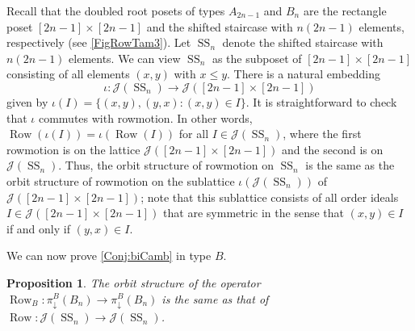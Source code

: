 \documentclass[11pt]{amsart}
\newtheorem{proposition}[theorem]{Proposition}
\theoremstyle{definition}
\DeclareMathOperator{\row}{Row}
\DeclareMathOperator{\SSS}{SS}
\begin{document}
Recall that the doubled root posets of types $A_{2n-1}$ and $B_n$ are the rectangle poset $[2n-1]\times[2n-1]$ and the shifted staircase with $n(2n-1)$ elements, respectively (see \cref{FigRowTam3}). Let $\SSS_n$ denote the shifted staircase with $n(2n-1)$ elements. We can view $\SSS_n$ as the subposet of $[2n-1]\times[2n-1]$ consisting of all elements $(x,y)$ with $x\leq y$. There is a natural embedding \[\iota\colon\mathcal J(\SSS_n)\to\mathcal J([2n-1]\times [2n-1])\] given by $\iota(I)=\{(x,y),(y,x):(x,y)\in I\}$. It is straightforward to check that $\iota$ commutes with rowmotion. In other words, $\row(\iota(I))=\iota(\row(I))$ for all $I\in\mathcal J(\SSS_n)$, where the first rowmotion is on the lattice $\mathcal J([2n-1]\times[2n-1])$ and the second is on $\mathcal J(\SSS_n)$. Thus, the orbit structure of rowmotion on $\SSS_n$ is the same as the orbit structure of rowmotion on the sublattice $\iota(\mathcal J(\SSS_n))$ of $\mathcal J([2n-1]\times [2n-1])$; note that this sublattice consists of all order ideals $I\in\mathcal J([2n-1]\times [2n-1])$ that are symmetric in the sense that $(x,y)\in I$ if and only if $(y,x)\in I$.   

We can now prove \cref{Conj:biCamb} in type $B$. 

\begin{proposition}\label{thm:conjecturetypeB}
    The orbit structure of the operator $\row_B\colon\pi_\downarrow^B(B_n)\to \pi_\downarrow^B(B_n)$ is the same as that of ${\row}\colon\mathcal J(\SSS_n)\to \mathcal J(\SSS_n)$. 
\end{proposition}
\end{document}
